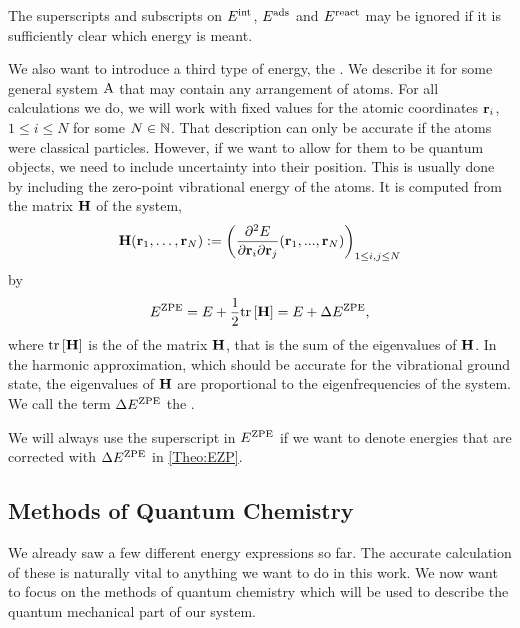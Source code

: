 \documentclass[8.5pt,twoside,twocolumn]{article}
\newcommand\zpe{\enmat{\te{ZPE}}}
\newcommand\eint{\enmat{E^{\te{int}}}}
\newcommand\eads{\enmat{E^{\te{ads}}}}
\newcommand\ere{\enmat{E^{\te{react}}}}
\newcommand\ezp{\enmat{E^{\zpe}}}
\renewcommand\H{\enmat{\bo H}}
\renewcommand\r{\bo r}
\theoremstyle{standard}
\begin{document}
The superscripts and subscripts on $\eint$, $\eads$ and $\ere$ may be ignored if it is sufficiently
clear which energy is meant.

We also want to introduce a third type of energy, the .
We describe it for some general system $\text A$ that may contain any arrangement of atoms.
For all calculations we do, we will work with fixed values for the atomic coordinates
$\r_i$, $1 \le i \le N$ for some $N \in \mathbb{N}$. That description can only be accurate if
the atoms were classical particles. However, if we want to allow for them to be
quantum objects, we need to include uncertainty into their position. This is usually
done by including the zero-point vibrational energy of the atoms. It is computed from the
 matrix $\H$ of the system,
\begin{equation}
 \H(\r_1,\ldots,\r_N) := \rb{\deri {^2 E} {\r_i \del \r_j} (\r_1,...,\r_N) }_{1\le i,j \le N}
 \label{Theo:Hessian}
\end{equation}
by
\begin{equation}
 \ezp=E + \frac 1 2 \te {tr} \ed{\H} = E + \Dl \ezp,
 \label{Theo:EZP}
\end{equation}
where $\te {tr} \ed{\H}$ is the  of the matrix $\H$, that is the sum of the eigenvalues
of $\H$. In the harmonic approximation, which should be accurate for the vibrational ground 
state, the eigenvalues of $\H$ are 
proportional
to the eigenfrequencies of the system. We call the term $\Dl \ezp$ the .

We will always use the superscript in $\ezp$ if we want to denote energies that are corrected 
with $\Dl \ezp$ in \eqref{Theo:EZP}.

\subsection{Methods of Quantum Chemistry}
\label{Sec:Theo:QMMet}

We already saw a few different energy expressions so far. The accurate calculation of these 
is naturally vital to anything we want to do in this work. We now want to focus on the methods
of quantum chemistry which will be used to describe the quantum mechanical part of our system.
\end{document}
